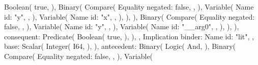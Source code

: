 \documentclass[
  oneside,
  english,
  coorientadorbanca,
  noabntexcite
]{ufsc-thesis-rn46-2019}
\begin{document}
\begin{rustcode}
{{{{                                Boolean(
                                    true,
                                ),
                                Binary(
                                    Compare(
                                        Equality {
                                            negated: false,
                                        },
                                    ),
                                    Variable(
                                        Name {
                                            id: "y",
                                        },
                                    ),
                                    Variable(
                                        Name {
                                            id: "x",
                                        },
                                    ),
                                ),
                            ),
                            Binary(
                                Compare(
                                    Equality {
                                        negated: false,
                                    },
                                ),
                                Variable(
                                    Name {
                                        id: "y",
                                    },
                                ),
                                Variable(
                                    Name {
                                        id: "__arg0",
                                    },
                                ),
                            ),
                        ),
                        consequent: Predicate(
                            Boolean(
                                true,
                            ),
                        ),
                    },
                    Implication {
                        binder: Name {
                            id: "lit",
                        },
                        base: Scalar(
                            Integer(
                                I64,
                            ),
                        ),
                        antecedent: Binary(
                            Logic(
                                And,
                            ),
                            Binary(
                                Compare(
                                    Equality {
                                        negated: false,
                                    },
                                ),
                                Variable(
}}}}
\end{rustcode}
\end{document}
